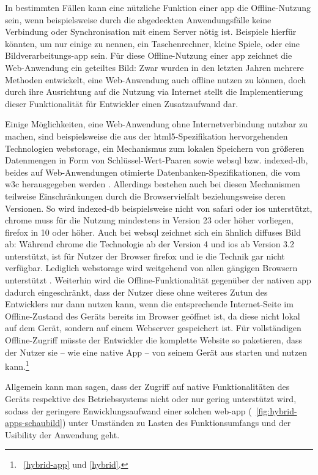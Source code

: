 In bestimmten Fällen kann eine nützliche Funktion einer \gls{app} die Offline-Nutzung sein, wenn beispielsweise durch die abgedeckten Anwendungsfälle keine Verbindung oder Synchronisation mit einem Server nötig ist. Beispiele hierfür könnten, um nur einige zu nennen, ein Taschenrechner, kleine Spiele, oder eine Bildverarbeitungs-\gls{app} sein. 
Für diese Offline-Nutzung einer \gls{app} zeichnet die Web-Anwendung ein geteiltes Bild: Zwar wurden in den letzten Jahren mehrere Methoden entwickelt, eine Web-Anwendung auch offline nutzen zu können, doch durch ihre Ausrichtung auf die Nutzung via Internet stellt die Implementierung dieser Funktionalität für Entwickler einen Zusatzaufwand dar. 

Einige Möglichkeiten, eine Web-Anwendung ohne Internetverbindung nutzbar zu machen, sind beispielsweise die aus der \gls{html5}-Spezifikation hervorgehenden Technologien \gls{webstorage}, ein Mechanismus zum lokalen Speichern von größeren Datenmengen in Form von Schlüssel-Wert-Paaren \cite{w3c_webstorage} sowie \gls{websql} bzw. \gls{indexed-db}, beides auf Web-Anwendungen otimierte Datenbanken-Spezifikationen, die vom \gls{w3c} herausgegeben werden \cite{w3c_websql, w3c_indexedDB}.
Allerdings bestehen auch bei diesen Mechanismen teilweise Einschränkungen durch die Browservielfalt beziehungsweise deren Versionen. So wird \gls{indexed-db} beispielsweise nicht von \gls{safari} oder \gls{ios} unterstützt, \gls{chrome} muss für die Nutzung mindestens in Version 23 oder höher vorliegen, \gls{firefox} in 10 oder höher. 
Auch bei \gls{websql} zeichnet sich ein ähnlich diffuses Bild ab: Während \gls{chrome} die Technologie ab der Version 4 und \gls{ios} ab Version 3.2 unterstützt, ist für Nutzer der Browser \gls{firefox} und \gls{ie} die Technik gar nicht verfügbar.
Lediglich \gls{webstorage} wird weitgehend von allen gängigen Browsern unterstützt \cite{html5-rocks_offline}.
Weiterhin wird die Offline-Funktionalität gegenüber der nativen \gls{app} dadurch eingeschränkt, dass der Nutzer diese ohne weiteres Zutun des Entwicklers nur dann nutzen kann, wenn die entsprechende Internet-Seite im Offline-Zustand des Geräts bereits im Browser geöffnet ist, da diese nicht lokal auf dem Gerät, sondern auf einem Webserver gespeichert ist.
Für vollständigen Offline-Zugriff müsste der Entwickler die komplette Website so paketieren, dass der Nutzer sie -- wie eine native App -- von seinem Gerät aus starten und nutzen kann.\footnote{\seename\ \autoref{hybrid-app} und \ref{hybrid}.}

Allgemein kann man sagen, dass der Zugriff auf native Funktionalitäten des Geräts respektive des Betriebssystems nicht oder nur gering unterstützt wird, sodass der geringere Enwicklungsaufwand einer solchen \gls{web-app} (\seename\  \autoref{fig:hybrid-apps-schaubild}) unter Umständen zu Lasten des Funktionsumfangs und der Usibility der Anwendung geht.

